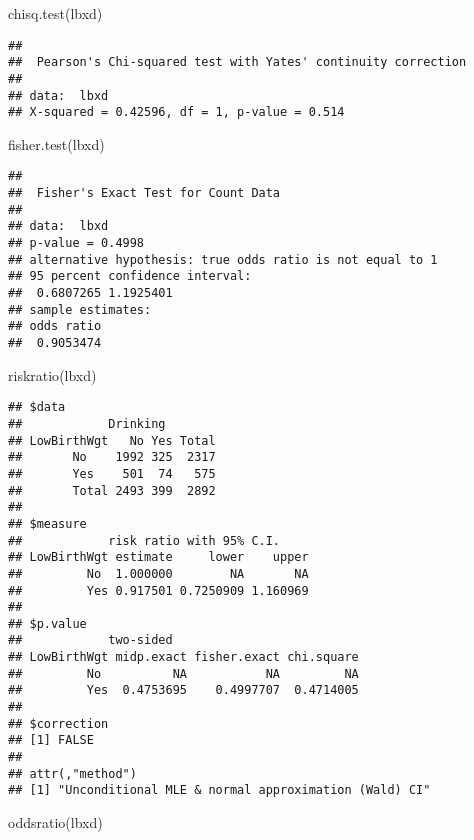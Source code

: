 \documentclass[
]{article}
\newenvironment{Shaded}{\begin{snugshade}}{\end{snugshade}}
\newcommand{\FunctionTok}[1]{\textcolor[rgb]{0.00,0.00,0.00}{#1}}
\newcommand{\NormalTok}[1]{#1}
\begin{document}
\begin{Shaded}
\begin{Highlighting}[]
\FunctionTok{chisq.test}\NormalTok{(lbxd)}
\end{Highlighting}
\end{Shaded}

\begin{verbatim}
## 
##  Pearson's Chi-squared test with Yates' continuity correction
## 
## data:  lbxd
## X-squared = 0.42596, df = 1, p-value = 0.514
\end{verbatim}

\begin{Shaded}
\begin{Highlighting}[]
\FunctionTok{fisher.test}\NormalTok{(lbxd)}
\end{Highlighting}
\end{Shaded}

\begin{verbatim}
## 
##  Fisher's Exact Test for Count Data
## 
## data:  lbxd
## p-value = 0.4998
## alternative hypothesis: true odds ratio is not equal to 1
## 95 percent confidence interval:
##  0.6807265 1.1925401
## sample estimates:
## odds ratio 
##  0.9053474
\end{verbatim}

\begin{Shaded}
\begin{Highlighting}[]
\FunctionTok{riskratio}\NormalTok{(lbxd)}
\end{Highlighting}
\end{Shaded}

\begin{verbatim}
## $data
##            Drinking
## LowBirthWgt   No Yes Total
##       No    1992 325  2317
##       Yes    501  74   575
##       Total 2493 399  2892
## 
## $measure
##            risk ratio with 95% C.I.
## LowBirthWgt estimate     lower    upper
##         No  1.000000        NA       NA
##         Yes 0.917501 0.7250909 1.160969
## 
## $p.value
##            two-sided
## LowBirthWgt midp.exact fisher.exact chi.square
##         No          NA           NA         NA
##         Yes  0.4753695    0.4997707  0.4714005
## 
## $correction
## [1] FALSE
## 
## attr(,"method")
## [1] "Unconditional MLE & normal approximation (Wald) CI"
\end{verbatim}

\begin{Shaded}
\begin{Highlighting}[]
\FunctionTok{oddsratio}\NormalTok{(lbxd)}
\end{Highlighting}
\end{Shaded}
\end{document}
